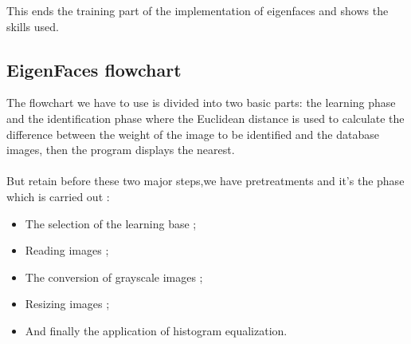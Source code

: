 This ends the training part of the implementation of eigenfaces and shows the skills used.



\subsection{EigenFaces flowchart}

The flowchart we  have to use is  divided into two basic parts: the learning phase and the identification phase where the Euclidean distance is used to calculate the difference between the weight of the image to be identified and the database images, then the program displays the nearest.
\paragraph{}
But retain before these two major steps,we have  pretreatments and it’s the phase which is carried out :
\begin{itemize}
\item The selection of the learning base ;
\item Reading images ;
\item The conversion of grayscale images ;
\item Resizing images ;
\item And finally the application of histogram equalization.
\end{itemize}


